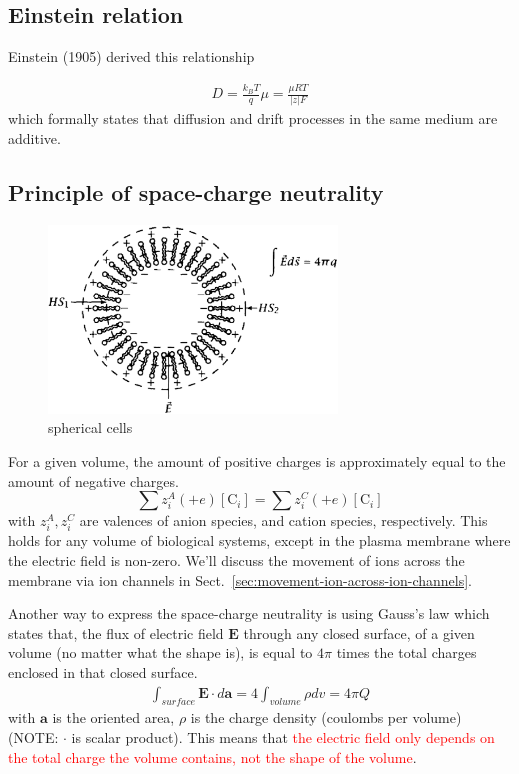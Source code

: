 \subsection{Einstein relation}
\label{sec:einstein-relation}

Einstein (1905) derived this relationship

\begin{eqnarray}
  \label{eq:412}
  D = \frac{k_BT}{q}\mu = \frac{\mu RT}{|z|F}
\end{eqnarray}
which formally states that diffusion and drift processes in the same
medium are additive.

\subsection{Principle of space-charge neutrality}
\label{sec:princ-space-charge}

\begin{figure}[hbt]
  \centerline{\includegraphics[height=5cm,
    angle=0]{./images/sphere_cell_02.eps}}
  \caption{spherical cells}
  \label{fig:sphere_cell_charge}
\end{figure}

For a given volume, the amount of positive charges is approximately equal to the
amount of negative charges. 
\begin{equation}
  \label{eq:1371}
  \sum z_i^A (+e) [\text{C}_i] =   \sum z_i^C (+e) [\text{C}_i] 
\end{equation}
with $z_i^A, z_i^C$ are valences of anion species, and cation species,
respectively.  This holds for any volume of biological systems, except
in the plasma membrane where the electric field is non-zero. We'll
discuss the movement of ions across the membrane via ion channels in
Sect.~\ref{sec:movement-ion-across-ion-channels}.

Another way to express the space-charge neutrality is using Gauss's
law which states that, the flux of electric field $\mathbf{E}$ through
any closed surface, of a given volume (no matter what the shape is),
is equal to $4\pi$ times the total charges enclosed in that closed
surface.
\begin{eqnarray}
  \label{eq:413}
  \int_{surface} \mathbf{E}\cdot d\mathbf{a} = 4\int_{volume} \rho dv = 4\pi Q
\end{eqnarray}
with $\mathbf{a}$ is the oriented area, $\rho$ is the charge density
(coulombs per volume) (NOTE: $\cdot$ is scalar product). This means
that
\textcolor{red}{the electric field only depends on the total charge
  the volume contains, not the shape of the volume}.


